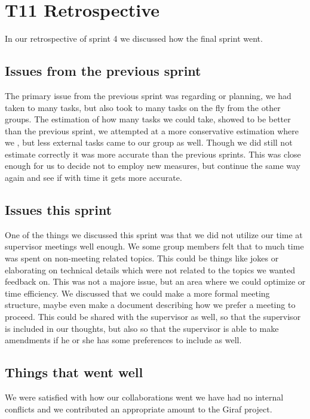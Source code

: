 \section{\gls{T11} Retrospective}

In our retrospective of sprint 4 we discussed how the final sprint went.

\subsection{Issues from the previous sprint}
The primary issue from the previous sprint was regarding or planning, we had taken to many tasks, but also took to many tasks on the fly from the other groups.
The estimation of how many tasks we could take, showed to be better than the previous sprint, we attempted at a more conservative estimation where we , but less external tasks came to our group as well. Though we did still not estimate correctly it was more accurate than the previous  sprints. This was close enough for us to decide not to employ new measures, but continue the same way again and see if with time it gets more accurate.

\subsection{Issues this sprint}
One of the things we discussed this sprint was that we did not utilize our time at supervisor meetings well enough. We some group members felt that to much time was spent on non-meeting related topics. This could be things like jokes or elaborating on technical details which were not related to the topics we wanted feedback on. This was not a majore issue, but an area where we could optimize or time efficiency.
We discussed that we could make a more formal meeting structure, maybe even make a document describing how we prefer a meeting to proceed. This could be shared with the supervisor as well, so that the supervisor is included in our thoughts, but also so that the supervisor is able to make amendments if he or she has some preferences to include as well.

\subsection{Things that went well}
We were satisfied with how our collaborations went we have had no internal conflicts and we contributed an appropriate amount to the Giraf project. 
